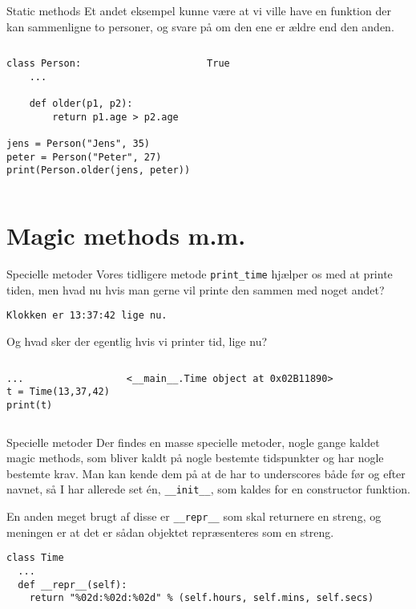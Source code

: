 \documentclass[main.tex]{subfiles}
\begin{document}
\begin{frame}[fragile]{Static methods}
Et andet eksempel kunne være at vi ville have en funktion der kan sammenligne to personer, og svare på om den ene er ældre end den anden.

\begin{columns}
	\begin{lstlisting}[style=python]
class Person:
	...
	
	def older(p1, p2):
		return p1.age > p2.age

jens = Person("Jens", 35)
peter = Person("Peter", 27)
print(Person.older(jens, peter))
	\end{lstlisting}
	\pause
	\begin{lstlisting}[style=python]
True
	\end{lstlisting}
\end{columns}

\end{frame}


\section{Magic methods m.m.}



\begin{frame}[fragile]{Specielle metoder}
Vores tidligere metode \texttt{print\_time} hjælper os med at printe tiden, men hvad nu hvis man gerne vil printe den sammen med noget andet?
\begin{lstlisting}[style=python]
Klokken er 13:37:42 lige nu.
\end{lstlisting}
\pause
Og hvad sker der egentlig hvis vi printer tid, lige nu?
\begin{columns}
\begin{lstlisting}[style=python]
...
t = Time(13,37,42)
print(t)
\end{lstlisting}
\pause
{}
\begin{lstlisting}[style=python]
<__main__.Time object at 0x02B11890>
\end{lstlisting}
\end{columns}
\end{frame}


\begin{frame}[fragile]{Specielle metoder}
Der findes en masse specielle metoder, nogle gange kaldet magic methods, som bliver kaldt på nogle bestemte tidspunkter og har nogle bestemte krav. Man kan kende dem på at de har to underscores både før og efter navnet, så I har allerede set én, \texttt{\_\_init\_\_}, som kaldes for en constructor funktion.

En anden meget brugt af disse er \texttt{\_\_repr\_\_} som skal returnere en streng, og meningen er at det er sådan objektet repræsenteres som en streng.
\begin{lstlisting}[style=python]
class Time
  ...
  def __repr__(self):
    return "%02d:%02d:%02d" % (self.hours, self.mins, self.secs)
\end{lstlisting}
\end{frame}
\end{document}
